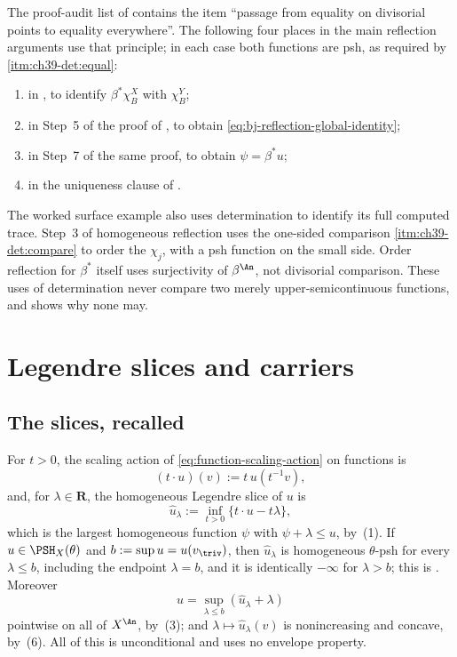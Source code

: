 \begin{remark}
\label{rem:ch39-audit-divisorial}
The proof-audit list of  contains the item
``passage from equality on divisorial points to equality everywhere''.  The
following four places in the main reflection arguments use that principle;
in each case both functions are psh, as required by
\,\cref{itm:ch39-det:equal}:
\begin{enumerate}
\item in , to identify
 $\beta^*\chi^X_B$ with $\chi^Y_B$;
\item in Step~5 of the proof of , to
 obtain \eqref{eq:bj-reflection-global-identity};
\item in Step~7 of the same proof, to obtain $\psi=\beta^*u$;
\item in the uniqueness clause of .
\end{enumerate}
The worked surface example also uses determination to identify its
full computed trace.  Step~3 of homogeneous reflection uses the one-sided
comparison \cref{itm:ch39-det:compare} to order the $\chi_j$, with a psh
function on the small side.  Order reflection for $\beta^*$ itself uses
surjectivity of $\beta^{\An}$, not divisorial comparison.
These uses of determination never compare two merely upper-semicontinuous
functions, and
 shows why none may.
\end{remark}

\section{Legendre slices and carriers}
\label{sec:ch39-legendre}

\subsection{The slices, recalled}
\label{sec:ch39-slices}

For $t>0$, the scaling action of \eqref{eq:function-scaling-action} on
functions is
\[
                   (t\mathbin\cdot u)(v):=t\,u(t^{-1}v),
\tag{39.32}\label{eq:bj-psh-scaling}
\]
and, for $\lambda\in\mathbf R$, the homogeneous Legendre slice of $u$ is
\[
 \widehat u_\lambda
 :=\inf_{t>0}\{t\mathbin\cdot u-t\lambda\},
\tag{39.33}\label{eq:bj-legendre-slice}
\]
which is the largest homogeneous function $\psi$ with
$\psi+\lambda\le u$, by
\,(1).  If $u\in\PSH_X(\theta)$ and
$b:=\sup u=u(v_{\triv})$, then $\widehat u_\lambda$ is homogeneous
$\theta$-psh for every $\lambda\le b$, including the endpoint
$\lambda=b$, and it is identically $-\infty$ for $\lambda>b$; this is
.  Moreover
\[
                   u=\sup_{\lambda\le b}
                       (\widehat u_\lambda+\lambda)
\tag{39.34}\label{eq:bj-legendre-reconstruction}
\]
pointwise on all of $X^{\An}$, by
\,(3); and
$\lambda\mapsto\widehat u_\lambda(v)$ is nonincreasing and concave, by
\,(6).  All of this is unconditional and uses no
envelope property.

